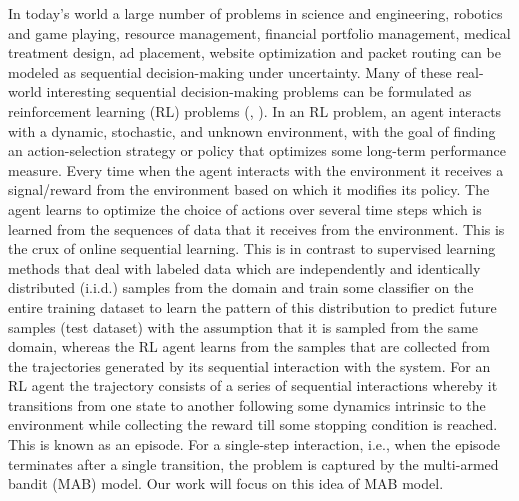 In today's world a large number of problems in science and engineering, robotics and 
game playing, resource management, financial portfolio
management, medical treatment design, ad placement, website optimization and packet routing can be modeled as sequential decision-making under uncertainty. Many of these real-world interesting
sequential decision-making problems can be formulated as reinforcement
learning (RL) problems (\cite{bertsekas1996neuro}, \cite{sutton1998reinforcement}). In an RL problem, an agent interacts with a dynamic, stochastic, and unknown environment, with the goal of finding an action-selection strategy or policy that optimizes some long-term performance measure. Every time when the agent interacts with the environment it receives a signal/reward from the environment based on which it modifies its policy. The agent learns to optimize the choice of actions over several time steps which is learned from the sequences of data that it receives from the environment. This is the crux of online sequential learning. This is in contrast to supervised learning methods that deal with labeled data which are independently and identically distributed (i.i.d.) samples from the domain and train some classifier on the entire training dataset to learn the pattern of this distribution to predict future samples (test dataset) with the assumption that it is sampled from the same domain, whereas the RL agent learns from the samples that are collected from the trajectories generated by its sequential interaction with the system. For an RL agent the trajectory consists of a series of sequential interactions whereby it transitions from one state to another following some dynamics intrinsic to the environment while collecting the reward till some stopping condition is reached. This is known as an episode. For a single-step interaction, i.e., when the episode terminates after a single transition, the problem is captured by the multi-armed bandit (MAB) model. Our work will focus on this idea of MAB model.
